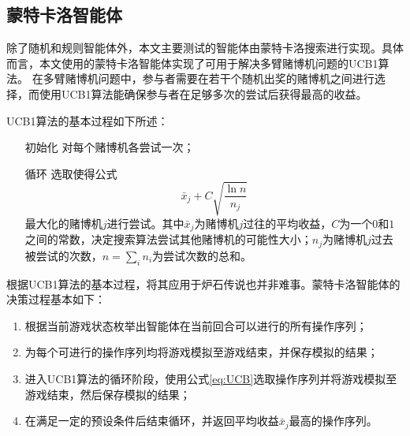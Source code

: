 \subsection{蒙特卡洛智能体}
\label{section:MonteCarloAIPlayers}

除了随机和规则智能体外，本文主要测试的智能体由蒙特卡洛搜索进行实现。具体而言，本文使用的蒙特卡洛智能体实现了可用于解决多臂赌博机问题的UCB1算法\cite{auer2002finite}。
在多臂赌博机问题中，参与者需要在若干个随机出奖的赌博机之间进行选择，而使用UCB1算法能确保参与者在足够多次的尝试后获得最高的收益。

UCB1算法的基本过程如下所述：
\begin{itemize}
\item[初始化] 对每个赌博机各尝试一次；
\item[循环] 选取使得公式
\begin{equation}
\label{eq:UCB}
\bar{x}_j + C\sqrt{\frac{\ln n}{n_j}}
\end{equation}
最大化的赌博机$j$进行尝试。其中$\bar{x}_j$为赌博机$j$过往的平均收益，$C$为一个$0$和$1$之间的常数，决定搜索算法尝试其他赌博机的可能性大小；$n_j$为赌博机$j$过去被尝试的次数，$n=\sum_i n_i$为尝试次数的总和。
\end{itemize}

根据UCB1算法的基本过程，将其应用于炉石传说也并非难事。蒙特卡洛智能体的决策过程基本如下：
\begin{enumerate}
\item 根据当前游戏状态枚举出智能体在当前回合可以进行的所有操作序列；
\item 为每个可进行的操作序列均将游戏模拟至游戏结束，并保存模拟的结果；
\item 进入UCB1算法的循环阶段，使用公式\ref{eq:UCB}选取操作序列并将游戏模拟至游戏结束，然后保存模拟的结果；
\item 在满足一定的预设条件后结束循环，并返回平均收益$\bar{x}_j$最高的操作序列。
\end{enumerate}
